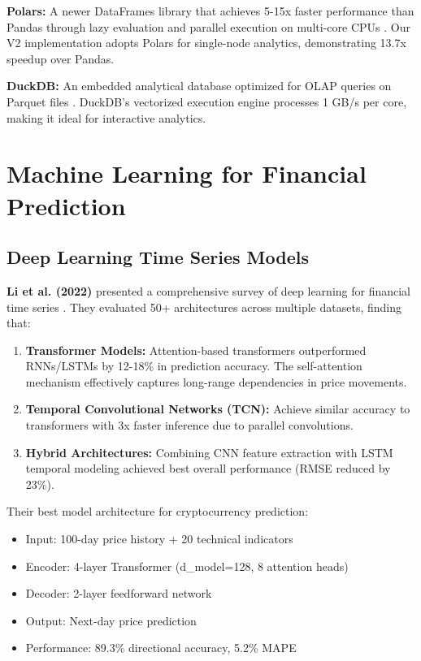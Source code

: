 \documentclass[conference]{IEEEtran}
\begin{document}
\textbf{Polars:} A newer DataFrames library that achieves 5-15x faster performance than Pandas through lazy evaluation and parallel execution on multi-core CPUs \cite{polars2023}. Our V2 implementation adopts Polars for single-node analytics, demonstrating 13.7x speedup over Pandas.

\textbf{DuckDB:} An embedded analytical database optimized for OLAP queries on Parquet files \cite{raasveldt2019duckdb}. DuckDB's vectorized execution engine processes 1 GB/s per core, making it ideal for interactive analytics.

\section{Machine Learning for Financial Prediction}

\subsection{Deep Learning Time Series Models}

\textbf{Li et al. (2022)} presented a comprehensive survey of deep learning for financial time series \cite{li2022deep}. They evaluated 50+ architectures across multiple datasets, finding that:

\begin{enumerate}
    \item \textbf{Transformer Models:} Attention-based transformers outperformed RNNs/LSTMs by 12-18\% in prediction accuracy. The self-attention mechanism effectively captures long-range dependencies in price movements.
    
    \item \textbf{Temporal Convolutional Networks (TCN):} Achieve similar accuracy to transformers with 3x faster inference due to parallel convolutions.
    
    \item \textbf{Hybrid Architectures:} Combining CNN feature extraction with LSTM temporal modeling achieved best overall performance (RMSE reduced by 23\%).
\end{enumerate}

Their best model architecture for cryptocurrency prediction:
\begin{itemize}
    \item Input: 100-day price history + 20 technical indicators
    \item Encoder: 4-layer Transformer (d\_model=128, 8 attention heads)
    \item Decoder: 2-layer feedforward network
    \item Output: Next-day price prediction
    \item Performance: 89.3\% directional accuracy, 5.2\% MAPE
\end{itemize}
\end{document}
